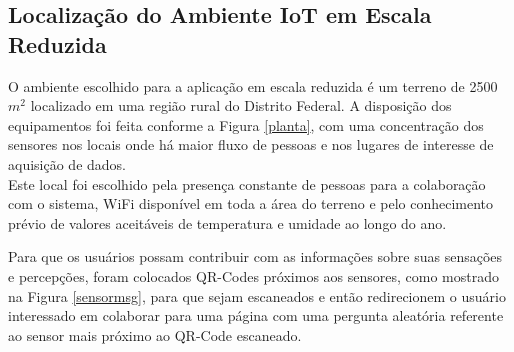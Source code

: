 \subsection{Localização do Ambiente IoT em Escala Reduzida}
\quad O ambiente escolhido para a aplicação em escala reduzida é um terreno de 2500 $m^2$ localizado em uma
região rural do Distrito Federal. A disposição dos equipamentos foi feita conforme a Figura \ref{planta},
com uma concentração dos sensores nos locais onde há maior fluxo de pessoas e nos lugares de interesse de
aquisição de dados.
\\\null \quad Este local foi escolhido pela presença constante de pessoas para a colaboração com o sistema, WiFi disponível em toda a área do terreno e pelo conhecimento prévio de valores aceitáveis de temperatura
  e umidade ao longo do ano.
\newpage

\newpage
Para que os usuários possam contribuir com as informações sobre suas sensações e percepções, foram colocados QR-Codes próximos aos sensores, como mostrado na Figura \ref{sensormsg}, para que sejam escaneados e então redirecionem o usuário interessado em colaborar para uma página com uma pergunta aleatória referente ao sensor mais próximo ao QR-Code escaneado.


